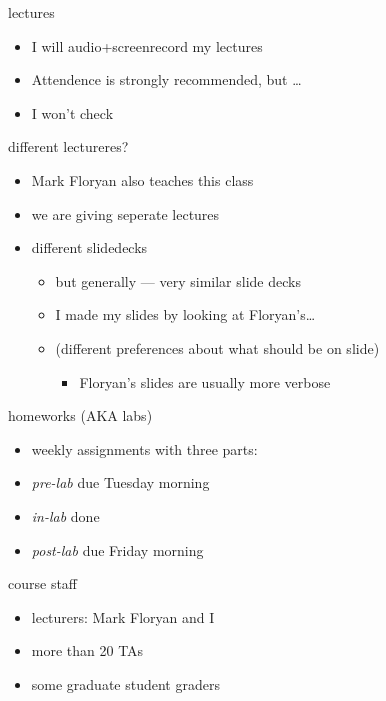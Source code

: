 \begin{frame}{lectures}
    \begin{itemize}
    \item I will audio+screenrecord my lectures
    \item Attendence is strongly recommended, but \ldots
    \item I won't check
    \end{itemize}
\end{frame}

\begin{frame}{different lectureres?}
    \begin{itemize}
    \item Mark Floryan also teaches this class
    \item we are giving seperate lectures
    \item different slidedecks
        \begin{itemize}
        \item but generally --- very similar slide decks
        \item I made my slides by looking at Floryan's\ldots
        \item (different preferences about what should be on slide)
            \begin{itemize}
            \item Floryan's slides are usually more verbose
            \end{itemize}
        \end{itemize}
    \end{itemize}
\end{frame}

\begin{frame}{homeworks (AKA labs)}
    \begin{itemize}
    \item weekly assignments with three parts:
    \vspace{.5cm}
    \item \textit{pre-lab} due Tuesday morning
    \item \textit{in-lab} done 
    \item \textit{post-lab} due Friday morning
    \end{itemize}
\end{frame}

\begin{frame}{course staff}
    \begin{itemize}
        \item lecturers: Mark Floryan and I
        \item more than 20 TAs
        \item some graduate student graders
    \end{itemize}
\end{frame}

